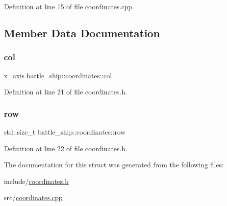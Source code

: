 Definition at line 15 of file coordinates.\+cpp.



\subsection{Member Data Documentation}
\mbox{\label{structbattle__ship_1_1coordinates_acda28ed24b163de319f6431762db3a72}} 
\subsubsection{\texorpdfstring{col}{col}}
{\footnotesize\ttfamily \hyperlink{namespacebattle__ship_ab3bfa90e413692dac2d4463364f80561}{x\+\_\+axis} battle\+\_\+ship\+::coordinates\+::col}



Definition at line 21 of file coordinates.\+h.

\mbox{\label{structbattle__ship_1_1coordinates_a436b0722a4b7244c5cbdcaefb2a76f0f}} 
\subsubsection{\texorpdfstring{row}{row}}
{\footnotesize\ttfamily std\+::size\+\_\+t battle\+\_\+ship\+::coordinates\+::row}



Definition at line 22 of file coordinates.\+h.



The documentation for this struct was generated from the following files\+:\begin{DoxyCompactItemize}
\item 
include/\hyperlink{coordinates_8h}{coordinates.\+h}\item 
src/\hyperlink{coordinates_8cpp}{coordinates.\+cpp}\end{DoxyCompactItemize}
